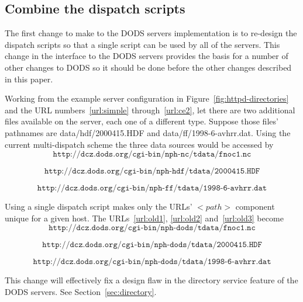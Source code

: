 \documentclass{article}
\begin{document}
\subsection{Combine the dispatch scripts}
The first change to make to the DODS servers implementation is to re-design
the dispatch scripts so that a single script can be used by all of the
servers. This change in the interface to the DODS servers provides the basis
for a number of other changes to DODS so it should be done before the other
changes described in this paper. 

Working from the example server configuration in
Figure~\ref{fig:httpd-directories} and the URL numbers~\ref{url:simple}
through~\ref{url:ce2}, let there are two additional files available on
the server, each one of a different type. Suppose those files' pathnames are
data/hdf/2000415.HDF and data/ff/1998-6-avhrr.dat. Using the current
multi-dispatch scheme the three data sources would be accessed by 
\begin{equation}
\texttt{http://dcz.dods.org/cgi-bin/nph-nc/tdata/fnoc1.nc}
\label{url:old1}
\end{equation}

\begin{equation}
\texttt{http://dcz.dods.org/cgi-bin/nph-hdf/tdata/2000415.HDF}
\label{url:old2}
\end{equation}

\begin{equation}
\texttt{http://dcz.dods.org/cgi-bin/nph-ff/tdata/1998-6-avhrr.dat}
\label{url:old3}
\end{equation}

Using a single dispatch script makes only the URLs' $<path>$ component unique
for a given host. The URLs~\ref{url:old1}, \ref{url:old2} and~\ref{url:old3}
become 
\begin{equation}
\texttt{http://dcz.dods.org/cgi-bin/nph-dods/tdata/fnoc1.nc}
\label{url:new1}
\end{equation}

\begin{equation}
\texttt{http://dcz.dods.org/cgi-bin/nph-dods/tdata/2000415.HDF}
\label{url:new2}
\end{equation}

\begin{equation}
\texttt{http://dcz.dods.org/cgi-bin/nph-dods/tdata/1998-6-avhrr.dat}
\label{url:new3}
\end{equation}

This change will effectively fix a design flaw in the directory service
feature of the DODS servers. See Section~\ref{sec:directory}.
\end{document}

